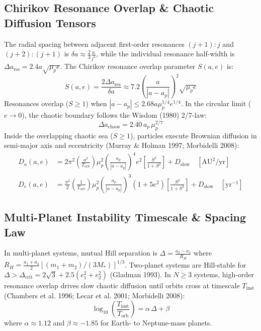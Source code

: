 \documentclass[11pt,a4paper]{article}
\begin{document}
\subsection{Chirikov Resonance Overlap \& Chaotic Diffusion Tensors}
The radial spacing between adjacent first-order resonances $(j+1):j$ and $(j+2):(j+1)$ is $\delta a \approx \frac{2}{3} \frac{a}{j^2}$, while the individual resonance half-width is $\Delta a_{\text{res}} = 2.4 a \sqrt{\mu_p e}$. The Chirikov resonance overlap parameter $S(a, e)$ is:
\begin{equation}
S(a, e) = \frac{2 \Delta a_{\text{res}}}{\delta a} \approx 7.2 \left(\frac{a}{|a - a_p|}\right)^2 \sqrt{\mu_p e}
\label{eq:chirikov}
\end{equation}
Resonances overlap ($S \ge 1$) when $|a - a_p| \le 2.68 a \mu_p^{1/4} e^{1/4}$. In the circular limit ($e \to 0$), the chaotic boundary follows the Wisdom (1980) 2/7-law:
\begin{equation}
\Delta a_{\text{chaos}} = 2.40\, a_p\, \mu_p^{2/7}
\label{eq:wisdom}
\end{equation}
Inside the overlapping chaotic sea ($S \ge 1$), particles execute Brownian diffusion in semi-major axis and eccentricity (Murray \& Holman 1997; Morbidelli 2008):
\begin{align}
D_a(a, e) &= 2\pi^2 \left(\frac{a^2}{T_{\text{orb}}}\right) \mu_p^2 \left(\frac{a_p}{|a - a_p|}\right)^4 e^2 \left[ \frac{S^2}{1 + S^2} \right] + D_{\text{slow}} \quad [\text{AU}^2/\text{yr}] \label{eq:da} \\
D_e(a, e) &= \frac{\pi^2}{2} \left(\frac{1}{T_{\text{orb}}}\right) \mu_p^2 \left(\frac{a_p}{|a - a_p|}\right)^3 (1 + 5 e^2) \left[ \frac{S^2}{1 + S^2} \right] + D_{\text{slow}} \quad [\text{yr}^{-1}] \label{eq:de}
\end{align}

\subsection{Multi-Planet Instability Timescale \& Spacing Law}
In multi-planet systems, mutual Hill separation is $\Delta = \frac{a_2 - a_1}{R_H}$ where $R_H = \frac{a_1 + a_2}{2} [ (m_1 + m_2)/(3M_*) ]^{1/3}$. Two-planet systems are Hill-stable for $\Delta > \Delta_{\text{crit}} = 2\sqrt{3} + 2.5(e_1^2 + e_2^2)$ (Gladman 1993). In $N \ge 3$ systems, high-order resonance overlap drives slow chaotic diffusion until orbits cross at timescale $T_{\text{inst}}$ (Chambers et al. 1996; Lecar et al. 2001; Morbidelli 2008):
\begin{equation}
\log_{10}\left( \frac{T_{\text{inst}}}{T_{\text{orb}}} \right) = \alpha\, \Delta + \beta
\label{eq:t_inst}
\end{equation}
where $\alpha \approx 1.12$ and $\beta \approx -1.85$ for Earth- to Neptune-mass planets.
\end{document}
